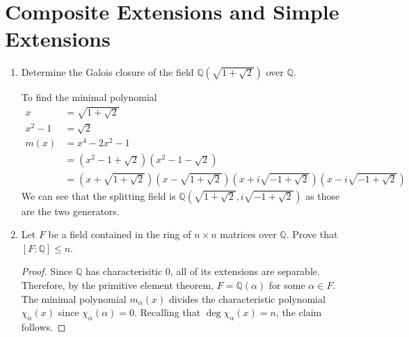 \documentclass{report}
\newcommand{\Q}{\mathbb{Q}}
\begin{document}
\section{Composite Extensions and Simple Extensions}
\begin{enumerate} 
	\item Determine the Galois closure of the field $\Q(\sqrt{1+\sqrt{2}})$ over $\Q$.
		\newline
		
		To find the minimal polynomial
		\begin{align*}
			x &= \sqrt{1+\sqrt{2}} \\
			x^2-1 &= \sqrt{2} \\
			m(x) &=x^4-2x^2-1 \\ 
			     &=(x^2-1+\sqrt{2})(x^2-1-\sqrt{2}) \\
			     &= \left(x+\sqrt{1+\sqrt{2}}\right)\left(x-\sqrt{1+\sqrt{2}}\right)\left(x+i\sqrt{-1+\sqrt{2}}\right)\left(x-i\sqrt{-1+\sqrt{2}}\right)
		\end{align*}
		We can see that the splitting field is $\Q(\sqrt{1+\sqrt{2}},i\sqrt{-1+\sqrt{2}})$ as those are the two generators.
		\setcounter{enumi}{2}
	\item Let $F$ be a field contained in the ring of $n\times n$ matrices over $\Q$. Prove that $[F:\Q]\leq n$.
		\begin{proof}
			Since $\Q$ has characterisitic $0$, all of its extensions are separable. Therefore, by the primitive element theorem, $F=\Q(\alpha)$ for some $\alpha\in F$.
			The minimal polynomial $m_\alpha(x)$ divides the characteristic polynomial $\chi_\alpha(x)$ since $\chi_\alpha(\alpha)=0$.
			Recalling that $\deg \chi_\alpha(x)=n$, the claim follows.
		\end{proof}
		
\end{enumerate}
\end{document}
